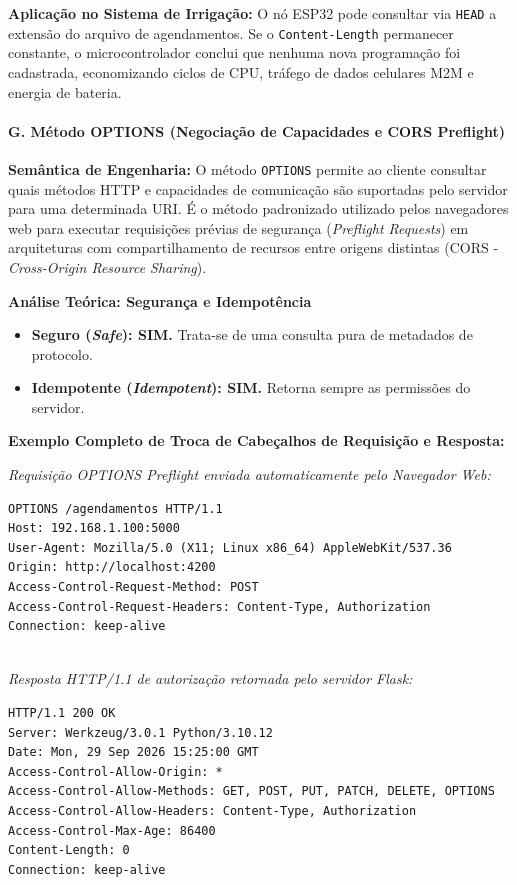 \textbf{Aplicação no Sistema de Irrigação:} O nó ESP32 pode consultar via \texttt{HEAD} a extensão do arquivo de agendamentos. Se o \texttt{Content-Length} permanecer constante, o microcontrolador conclui que nenhuma nova programação foi cadastrada, economizando ciclos de CPU, tráfego de dados celulares M2M e energia de bateria.

\paragraph*{G. Método OPTIONS (Negociação de Capacidades e CORS Preflight)}

\textbf{Semântica de Engenharia:} O método \texttt{OPTIONS} permite ao cliente consultar quais métodos HTTP e capacidades de comunicação são suportadas pelo servidor para uma determinada URI. É o método padronizado utilizado pelos navegadores web para executar requisições prévias de segurança (\textit{Preflight Requests}) em arquiteturas com compartilhamento de recursos entre origens distintas (CORS - \textit{Cross-Origin Resource Sharing}).

\textbf{Análise Teórica: Segurança e Idempotência}
\begin{itemize}
    \item \textbf{Seguro (\textit{Safe}): SIM.} Trata-se de uma consulta pura de metadados de protocolo.
    \item \textbf{Idempotente (\textit{Idempotent}): SIM.} Retorna sempre as permissões do servidor.
\end{itemize}

\textbf{Exemplo Completo de Troca de Cabeçalhos de Requisição e Resposta:}

\textit{Requisição OPTIONS Preflight enviada automaticamente pelo Navegador Web:}
\begin{lstlisting}
OPTIONS /agendamentos HTTP/1.1
Host: 192.168.1.100:5000
User-Agent: Mozilla/5.0 (X11; Linux x86_64) AppleWebKit/537.36
Origin: http://localhost:4200
Access-Control-Request-Method: POST
Access-Control-Request-Headers: Content-Type, Authorization
Connection: keep-alive


\end{lstlisting}

\textit{Resposta HTTP/1.1 de autorização retornada pelo servidor Flask:}
\begin{lstlisting}
HTTP/1.1 200 OK
Server: Werkzeug/3.0.1 Python/3.10.12
Date: Mon, 29 Sep 2026 15:25:00 GMT
Access-Control-Allow-Origin: *
Access-Control-Allow-Methods: GET, POST, PUT, PATCH, DELETE, OPTIONS
Access-Control-Allow-Headers: Content-Type, Authorization
Access-Control-Max-Age: 86400
Content-Length: 0
Connection: keep-alive


\end{lstlisting}

